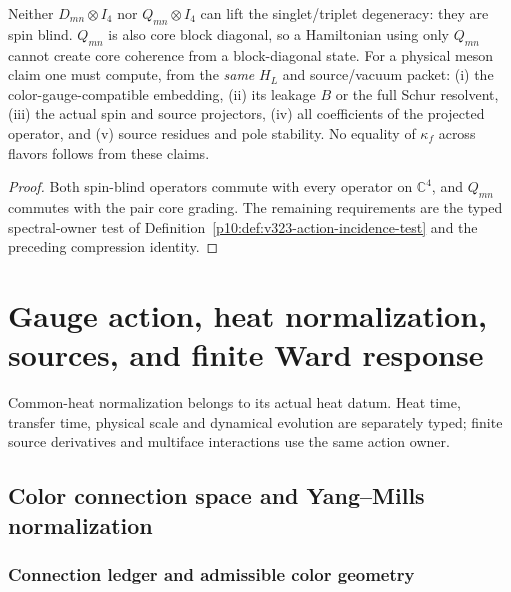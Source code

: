\documentclass[12pt,a4paper]{article}
\begin{document}
\begin{proposition}
\label{p10:prop:v327-spinblind-no-go}
Neither $D_{mn}\otimes I_4$ nor $Q_{mn}\otimes I_4$
can lift the singlet/triplet degeneracy: they are spin blind.
$Q_{mn}$ is also core block diagonal, so a Hamiltonian using only
$Q_{mn}$ cannot create core coherence from a block-diagonal state.
For a physical meson claim one must compute, from the \emph{same}
$H_L$ and source/vacuum packet: (i) the color-gauge-compatible
embedding, (ii) its leakage $B$ or the full Schur resolvent,
(iii) the actual spin and source projectors, (iv) all coefficients of
the projected operator, and (v) source residues and pole stability.
No equality of $\kappa_f$ across flavors follows from these claims.
\end{proposition}
\begin{proof}
Both spin-blind operators commute with every operator on
$\mathbb C^4$, and $Q_{mn}$ commutes with the pair core grading.
The remaining requirements are the typed spectral-owner test of
Definition~\ref{p10:def:v323-action-incidence-test} and the
preceding compression identity.
\end{proof}




\section{Gauge action, heat normalization, sources, and finite Ward response}
\label{p10:sec:v237-a3}
Common-heat normalization belongs to its actual heat datum. Heat time, transfer time, physical scale and dynamical evolution are separately typed; finite source derivatives and multiface interactions use the same action owner.

\subsection{Color connection space and Yang--Mills normalization}
\label{p10:sec:connection-space}


\subsubsection{Connection ledger and admissible color geometry}
\label{p10:subsec:connection-ledger-admissible-geometry}
\end{document}
